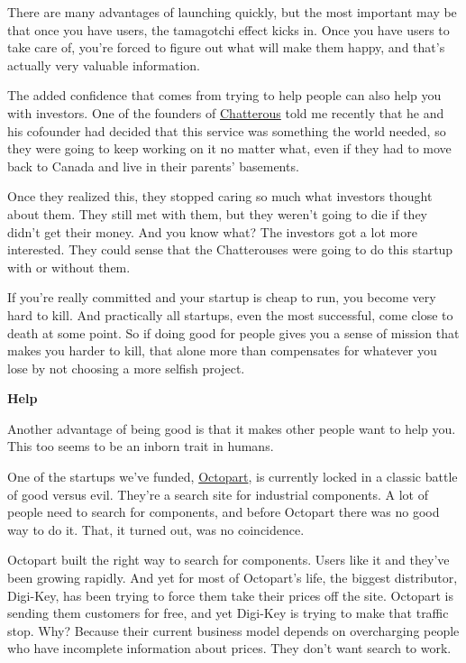 \documentclass[12pt]{book}
\begin{document}
There are many advantages of launching quickly, but the most important
may be that once you have users, the tamagotchi effect kicks in. Once
you have users to take care of, you're forced to figure out what will
make them happy, and that's actually very valuable information.

The added confidence that comes from trying to help people can also help
you with investors. One of the founders of
\href{http://chatterous.com}{Chatterous} told me recently that he and
his cofounder had decided that this service was something the world
needed, so they were going to keep working on it no matter what, even if
they had to move back to Canada and live in their parents' basements.

Once they realized this, they stopped caring so much what investors
thought about them. They still met with them, but they weren't going to
die if they didn't get their money. And you know what? The investors got
a lot more interested. They could sense that the Chatterouses were going
to do this startup with or without them.

If you're really committed and your startup is cheap to run, you become
very hard to kill. And practically all startups, even the most
successful, come close to death at some point. So if doing good for
people gives you a sense of mission that makes you harder to kill, that
alone more than compensates for whatever you lose by not choosing a more
selfish project.

\textbf{Help}

Another advantage of being good is that it makes other people want to
help you. This too seems to be an inborn trait in humans.

One of the startups we've funded, \href{http://octopart.com}{Octopart},
is currently locked in a classic battle of good versus evil. They're a
search site for industrial components. A lot of people need to search
for components, and before Octopart there was no good way to do it.
That, it turned out, was no coincidence.

Octopart built the right way to search for components. Users like it and
they've been growing rapidly. And yet for most of Octopart's life, the
biggest distributor, Digi-Key, has been trying to force them take their
prices off the site. Octopart is sending them customers for free, and
yet Digi-Key is trying to make that traffic stop. Why? Because their
current business model depends on overcharging people who have
incomplete information about prices. They don't want search to work.
\end{document}
